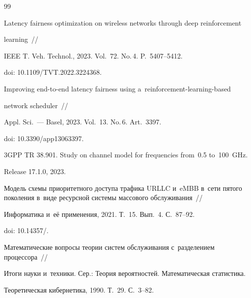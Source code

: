 {{\begin{thebibliography}{99}


Latency fairness optimization on wireless networks through deep reinforcement 


learning~/\!\!/


IEEE T. Veh. Technol., 2023. Vol.~72. No.\,4. P.~5407--5412.


doi: 10.1109\!/\!TVT.2022.3224368.









Improving end-to-end latency fairness using a~reinforcement-learning-based 


network scheduler~/\!\!/


Appl. Sci.~--- Basel, 2023. Vol.~13. No.\,6. Art.~3397.


doi: 10.3390\!/\!app13063397.







3GPP TR 38.901. Study on channel model for frequencies from~0.5 to~100~GHz. 


 Release 17.1.0, 2023.









Модель схемы приоритетного доступа трафика URLLC и~eMBB в~сети пятого поколения в~виде ресурсной системы массового обслуживания~/\!\!/


Информатика и~её применения, 2021. Т.~15. Вып.~4. С.~87--92.


doi: 10.14357\!/.









Математические вопросы теории систем обслуживания с~разделением процессора~/\!\!/


Итоги науки и~техники. Сер.: Теория вероятностей. Математическая статистика. 


Теоретическая кибернетика, 1990. Т.~29. С.~3--82.






\end{thebibliography}}}
